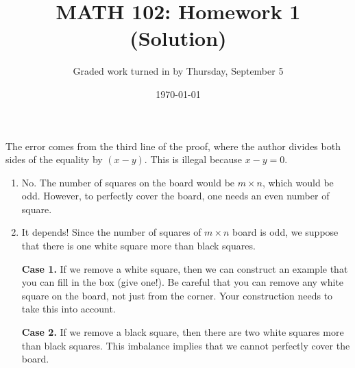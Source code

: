 \documentclass[12pt]{amsart}
\title{ MATH 102: Homework 1 (Solution)}
\author{Graded work turned in by Thursday, September 5}
\date{\today}
\begin{document}
\maketitle

\begin{problem}[Exercise 1.2]
The error comes from the third line of the proof, where
the author divides both sides of the equality by $(x-y)$.
This is illegal because $x-y = 0$.
\end{problem}

\begin{problem}[Exercise 1.3]
\begin{enumerate}
	\item No. The number of squares on the board would be $m\times n$,
	      which would be odd. However, to perfectly cover
	      the board, one needs an even number of square.
	\item It depends! Since the number of squares of $m\times n$ board
	      is odd, we suppose that there is one white square more than black squares.

		      {\bf Case 1.} If we remove a white square, then we can construct an example
	      that you can fill in the box (give one!). Be careful that you can remove any white square
	      on the board, not just from the corner. Your construction needs to take this into account.

		      {\bf Case 2.} If we remove a black square, then there are two white squares more than
	      black squares. This imbalance implies that we cannot perfectly cover the board.
\end{enumerate}
\end{problem}
\end{document}
